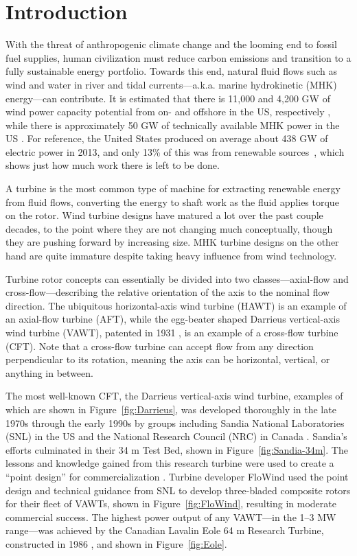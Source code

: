 \chapter{Introduction}

With the threat of anthropogenic climate change and the looming end to fossil
fuel supplies, human civilization must reduce carbon emissions \cite{Hansen2013}
and transition to a fully sustainable energy portfolio. Towards this end,
natural fluid flows such as wind and water in river and tidal currents---a.k.a.
marine hydrokinetic (MHK) energy---can contribute. It is estimated that there is
11,000 and 4,200 GW of wind power capacity potential from on- and offshore in
the US, respectively \cite{Lopez2012}, while there is approximately 50 GW of
technically available MHK power in the US \cite{Haas2011, Jacobson2012,
    Haas2013}. For reference, the United States produced on average about 438 GW of
electric power in 2013, and only 13\% of this was from renewable
sources~\cite{EIA2015}, which shows just how much work there is left to be done.

A turbine is the most common type of machine for extracting renewable energy
from fluid flows, converting the energy to shaft work as the fluid applies
torque on the rotor. Wind turbine designs have matured a lot over the past
couple decades, to the point where they are not changing much conceptually,
though they are pushing forward by increasing size. MHK turbine designs on the
other hand are quite immature despite taking heavy influence from wind
technology.

Turbine rotor concepts can essentially be divided into two classes---axial-flow
and cross-flow---describing the relative orientation of the axis to the nominal
flow direction. The ubiquitous horizontal-axis wind turbine (HAWT) is an example
of an axial-flow turbine (AFT), while the egg-beater shaped Darrieus
vertical-axis wind turbine (VAWT), patented in 1931 \cite{Darrieus1931}, is an
example of a cross-flow turbine (CFT). Note that a cross-flow turbine can accept
flow from any direction perpendicular to its rotation, meaning the axis can be
horizontal, vertical, or anything in between.

The most well-known CFT, the Darrieus vertical-axis wind turbine, examples of
which are shown in Figure~\ref{fig:Darrieus}, was developed thoroughly in the
late 1970s through the early 1990s by groups including Sandia National
Laboratories (SNL) in the US and the National Research Council (NRC) in Canada
\cite{Para2002}. Sandia's efforts culminated in their 34 m Test Bed, shown in
Figure~\ref{fig:Sandia-34m}. The lessons and knowledge gained from this research
turbine were used to create a ``point design'' for commercialization
\cite{Sutherland2012}. Turbine developer FloWind used the point design and
technical guidance from SNL to develop three-bladed composite rotors for their
fleet of VAWTs, shown in Figure~\ref{fig:FloWind}, resulting in moderate
commercial success. The highest power output of any VAWT---in the 1--3 MW
range---was achieved by the Canadian Lavalin Eole 64 m Research Turbine,
constructed in 1986 \cite{Para2002}, and shown in Figure~\ref{fig:Eole}.

